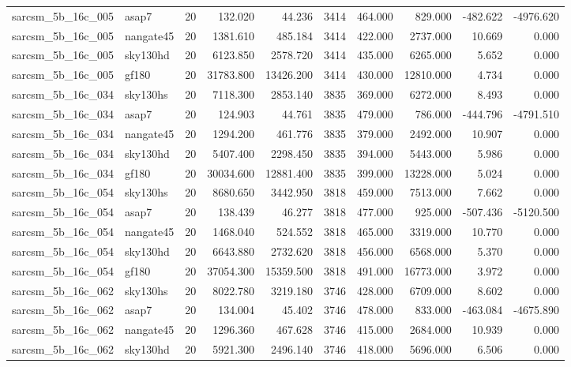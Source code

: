 \begin{tabular}{llrrrrrrrr}
sarcsm\_5b\_16c\_005 & asap7 & 20 & 132.020 & 44.236 & 3414 & 464.000 & 829.000 & -482.622 & -4976.620 \\
sarcsm\_5b\_16c\_005 & nangate45 & 20 & 1381.610 & 485.184 & 3414 & 422.000 & 2737.000 & 10.669 & 0.000 \\
sarcsm\_5b\_16c\_005 & sky130hd & 20 & 6123.850 & 2578.720 & 3414 & 435.000 & 6265.000 & 5.652 & 0.000 \\
sarcsm\_5b\_16c\_005 & gf180 & 20 & 31783.800 & 13426.200 & 3414 & 430.000 & 12810.000 & 4.734 & 0.000 \\
sarcsm\_5b\_16c\_034 & sky130hs & 20 & 7118.300 & 2853.140 & 3835 & 369.000 & 6272.000 & 8.493 & 0.000 \\
sarcsm\_5b\_16c\_034 & asap7 & 20 & 124.903 & 44.761 & 3835 & 479.000 & 786.000 & -444.796 & -4791.510 \\
sarcsm\_5b\_16c\_034 & nangate45 & 20 & 1294.200 & 461.776 & 3835 & 379.000 & 2492.000 & 10.907 & 0.000 \\
sarcsm\_5b\_16c\_034 & sky130hd & 20 & 5407.400 & 2298.450 & 3835 & 394.000 & 5443.000 & 5.986 & 0.000 \\
sarcsm\_5b\_16c\_034 & gf180 & 20 & 30034.600 & 12881.400 & 3835 & 399.000 & 13228.000 & 5.024 & 0.000 \\
sarcsm\_5b\_16c\_054 & sky130hs & 20 & 8680.650 & 3442.950 & 3818 & 459.000 & 7513.000 & 7.662 & 0.000 \\
sarcsm\_5b\_16c\_054 & asap7 & 20 & 138.439 & 46.277 & 3818 & 477.000 & 925.000 & -507.436 & -5120.500 \\
sarcsm\_5b\_16c\_054 & nangate45 & 20 & 1468.040 & 524.552 & 3818 & 465.000 & 3319.000 & 10.770 & 0.000 \\
sarcsm\_5b\_16c\_054 & sky130hd & 20 & 6643.880 & 2732.620 & 3818 & 456.000 & 6568.000 & 5.370 & 0.000 \\
sarcsm\_5b\_16c\_054 & gf180 & 20 & 37054.300 & 15359.500 & 3818 & 491.000 & 16773.000 & 3.972 & 0.000 \\
sarcsm\_5b\_16c\_062 & sky130hs & 20 & 8022.780 & 3219.180 & 3746 & 428.000 & 6709.000 & 8.602 & 0.000 \\
sarcsm\_5b\_16c\_062 & asap7 & 20 & 134.004 & 45.402 & 3746 & 478.000 & 833.000 & -463.084 & -4675.890 \\
sarcsm\_5b\_16c\_062 & nangate45 & 20 & 1296.360 & 467.628 & 3746 & 415.000 & 2684.000 & 10.939 & 0.000 \\
sarcsm\_5b\_16c\_062 & sky130hd & 20 & 5921.300 & 2496.140 & 3746 & 418.000 & 5696.000 & 6.506 & 0.000 \\

\end{tabular}
